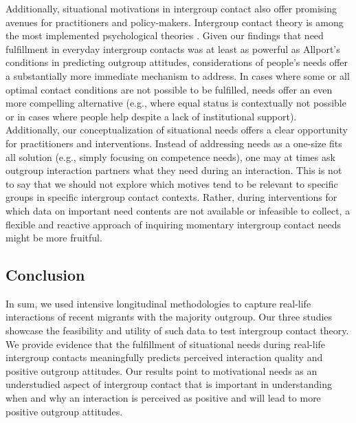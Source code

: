 \documentclass[man, 12pt, a4paper, mask]{apa7}
\theoremstyle{break}
\theoremstyle{plain}
\begin{document}
Additionally, situational motivations in intergroup contact also offer promising avenues for practitioners and policy-makers. Intergroup contact theory is among the most implemented psychological theories \citep[e.g.,][]{Pettigrew2006, AlRamiah2012a, Reimer2021}. Given our findings that need fulfillment in everyday intergroup contacts was at least as powerful as Allport's conditions in predicting outgroup attitudes, considerations of people's needs offer a substantially more immediate mechanism to address. In cases where some or all optimal contact conditions are not possible to be fulfilled, needs offer an even more compelling alternative (e.g., where equal status is contextually not possible or in cases where people help despite a lack of institutional support). Additionally, our conceptualization of situational needs offers a clear opportunity for practitioners and interventions. Instead of addressing needs as a one-size fits all solution (e.g., simply focusing on competence needs), one may at times ask outgroup interaction partners what they need during an interaction. This is not to say that we should not explore which motives tend to be relevant to specific groups in specific intergroup contact contexts. Rather, during interventions for which data on important need contents are not available or infeasible to collect, a flexible and reactive approach of inquiring momentary intergroup contact needs might be more fruitful.


\subsection{Conclusion}
In sum, we used intensive longitudinal methodologies to capture real-life interactions of recent migrants with the majority outgroup. Our three studies showcase the feasibility and utility of such data to test intergroup contact theory. We provide evidence that the fulfillment of situational needs during real-life intergroup contacts meaningfully predicts perceived interaction quality and positive outgroup attitudes. Our results point to motivational needs as an understudied aspect of intergroup contact that is important in understanding when and why an interaction is perceived as positive and will lead to more positive outgroup attitudes.







\end{document}
